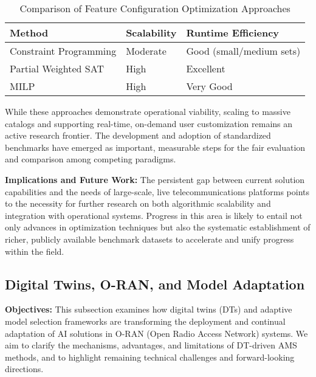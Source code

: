 \documentclass[sigconf]{acmart}
\begin{document}
\begin{table*}[htbp]
\centering
\caption{Comparison of Feature Configuration Optimization Approaches}
\label{tab:feature_config_methods}
\begin{adjustbox}{max width=\textwidth}
\begin{tabular}{@{}lll@{}}
\toprule
\textbf{Method} & \textbf{Scalability} & \textbf{Runtime Efficiency} \\
\midrule
Constraint Programming     & Moderate         & Good (small/medium sets)   \\
Partial Weighted SAT       & High             & Excellent                  \\
MILP                      & High             & Very Good                  \\
\bottomrule
\end{tabular}
\end{adjustbox}
\end{table*}

While these approaches demonstrate operational viability, scaling to massive catalogs and supporting real-time, on-demand user customization remains an active research frontier. The development and adoption of standardized benchmarks have emerged as important, measurable steps for the fair evaluation and comparison among competing paradigms. 

\textbf{Implications and Future Work:} The persistent gap between current solution capabilities and the needs of large-scale, live telecommunications platforms points to the necessity for further research on both algorithmic scalability and integration with operational systems. Progress in this area is likely to entail not only advances in optimization techniques but also the systematic establishment of richer, publicly available benchmark datasets to accelerate and unify progress within the field.

\subsection{Digital Twins, O-RAN, and Model Adaptation}

\textbf{Objectives:} This subsection examines how digital twins (DTs) and adaptive model selection frameworks are transforming the deployment and continual adaptation of AI solutions in O-RAN (Open Radio Access Network) systems. We aim to clarify the mechanisms, advantages, and limitations of DT-driven AMS methods, and to highlight remaining technical challenges and forward-looking directions.
\end{document}
